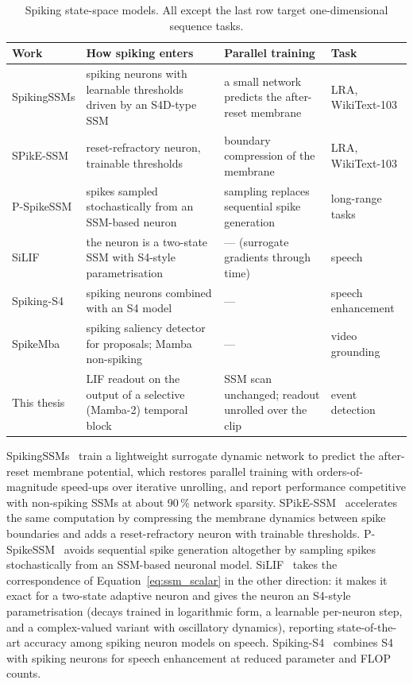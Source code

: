 \documentclass[11pt, a4paper]{report}
\begin{document}
\begin{table}[htbp]
\centering
\small
\caption{Spiking state-space models. All except the last row target one-dimensional sequence tasks.}
\label{tab:spiking_ssm}
\begin{tabularx}{\textwidth}{@{}l>{\raggedright\arraybackslash}X>{\raggedright\arraybackslash}Xl@{}}
\toprule
\textbf{Work} & \textbf{How spiking enters} & \textbf{Parallel training} & \textbf{Task} \\
\midrule
SpikingSSMs \cite{shen2025spikingssms} & spiking neurons with learnable thresholds driven by an S4D-type SSM &
  a small network predicts the after-reset membrane & LRA, WikiText-103 \\
SPikE-SSM \cite{zhong2024spike} & reset-refractory neuron, trainable thresholds & boundary compression of
  the membrane & LRA, WikiText-103 \\
P-SpikeSSM \cite{bal2025p} & spikes sampled stochastically from an SSM-based neuron & sampling replaces
  sequential spike generation & long-range tasks \\
SiLIF \cite{fabre2025silif} & the neuron is a two-state SSM with S4-style parametrisation & --- (surrogate
  gradients through time) & speech \\
Spiking-S4 \cite{du2023spiking} & spiking neurons combined with an S4 model & --- & speech enhancement \\
SpikeMba \cite{li2024spikemba} & spiking saliency detector for proposals; Mamba non-spiking & --- &
  video grounding \\
\midrule
This thesis & LIF readout on the output of a selective (Mamba-2) temporal block & SSM scan unchanged;
  readout unrolled over the clip & event detection \\
\bottomrule
\end{tabularx}
\end{table}

SpikingSSMs~\cite{shen2025spikingssms} train a lightweight surrogate dynamic network to predict the
after-reset membrane potential, which restores parallel training with orders-of-magnitude speed-ups over
iterative unrolling, and report performance competitive with non-spiking SSMs at about 90\,\% network
sparsity. SPikE-SSM~\cite{zhong2024spike} accelerates the same computation by compressing the membrane
dynamics between spike boundaries and adds a reset-refractory neuron with trainable thresholds.
P-SpikeSSM~\cite{bal2025p} avoids sequential spike generation altogether by sampling spikes stochastically
from an SSM-based neuronal model. SiLIF~\cite{fabre2025silif} takes the correspondence of
Equation~\eqref{eq:ssm_scalar} in the other direction: it makes it exact for a two-state adaptive neuron and
gives the neuron an S4-style parametrisation (decays trained in logarithmic form, a learnable per-neuron step,
and a complex-valued variant with oscillatory dynamics), reporting state-of-the-art accuracy among spiking
neuron models on speech. Spiking-S4~\cite{du2023spiking} combines S4 with spiking neurons for speech
enhancement at reduced parameter and FLOP counts.
\end{document}

